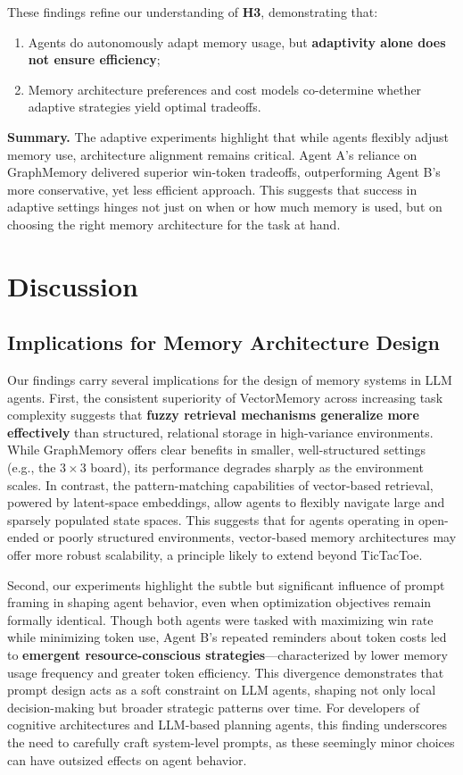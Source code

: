 \documentclass[10pt]{article}
\begin{document}
These findings refine our understanding of \textbf{H3}, demonstrating that:
\begin{enumerate}[leftmargin=*,nosep]
\item Agents do autonomously adapt memory usage, but \textbf{adaptivity alone does not ensure efficiency};
\item Memory architecture preferences and cost models co-determine whether adaptive strategies yield optimal tradeoffs.
\end{enumerate}

\textbf{Summary.}  The adaptive experiments highlight that while agents flexibly adjust memory use, architecture alignment remains critical. Agent A's reliance on GraphMemory delivered superior win-token tradeoffs, outperforming Agent B's more conservative, yet less efficient approach. This suggests that success in adaptive settings hinges not just on when or how much memory is used, but on choosing the right memory architecture for the task at hand.

\section{Discussion}

\subsection{Implications for Memory Architecture Design}

Our findings carry several implications for the design of memory systems in LLM agents. First, the consistent superiority of VectorMemory across increasing task complexity suggests that \textbf{fuzzy retrieval mechanisms generalize more effectively} than structured, relational storage in high-variance environments. While GraphMemory offers clear benefits in smaller, well-structured settings (e.g., the $3 \times 3$ board), its performance degrades sharply as the environment scales. In contrast, the pattern-matching capabilities of vector-based retrieval, powered by latent-space embeddings, allow agents to flexibly navigate large and sparsely populated state spaces. This suggests that for agents operating in open-ended or poorly structured environments, vector-based memory architectures may offer more robust scalability, a principle likely to extend beyond TicTacToe.

Second, our experiments highlight the subtle but significant influence of prompt framing in shaping agent behavior, even when optimization objectives remain formally identical. Though both agents were tasked with maximizing win rate while minimizing token use, Agent B's repeated reminders about token costs led to \textbf{emergent resource-conscious strategies}—characterized by lower memory usage frequency and greater token efficiency. This divergence demonstrates that prompt design acts as a soft constraint on LLM agents, shaping not only local decision-making but broader strategic patterns over time. For developers of cognitive architectures and LLM-based planning agents, this finding underscores the need to carefully craft system-level prompts, as these seemingly minor choices can have outsized effects on agent behavior.
\end{document}
